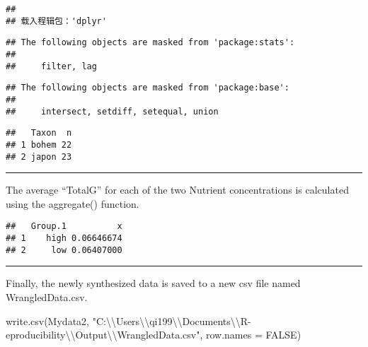 \documentclass[
]{article}
\newenvironment{Shaded}{\begin{snugshade}}{\end{snugshade}}
\newcommand{\AttributeTok}[1]{\textcolor[rgb]{0.77,0.63,0.00}{#1}}
\newcommand{\ConstantTok}[1]{\textcolor[rgb]{0.00,0.00,0.00}{#1}}
\newcommand{\ControlFlowTok}[1]{\textcolor[rgb]{0.13,0.29,0.53}{\textbf{#1}}}
\newcommand{\DecValTok}[1]{\textcolor[rgb]{0.00,0.00,0.81}{#1}}
\newcommand{\FunctionTok}[1]{\textcolor[rgb]{0.00,0.00,0.00}{#1}}
\newcommand{\NormalTok}[1]{#1}
\newcommand{\OtherTok}[1]{\textcolor[rgb]{0.56,0.35,0.01}{#1}}
\newcommand{\SpecialCharTok}[1]{\textcolor[rgb]{0.00,0.00,0.00}{#1}}
\newcommand{\StringTok}[1]{\textcolor[rgb]{0.31,0.60,0.02}{#1}}
\begin{document}
\begin{verbatim}
## 
## 载入程辑包：'dplyr'
\end{verbatim}

\begin{verbatim}
## The following objects are masked from 'package:stats':
## 
##     filter, lag
\end{verbatim}

\begin{verbatim}
## The following objects are masked from 'package:base':
## 
##     intersect, setdiff, setequal, union
\end{verbatim}

\begin{verbatim}
##   Taxon  n
## 1 bohem 22
## 2 japon 23
\end{verbatim}

\begin{center}\rule{0.5\linewidth}{0.5pt}\end{center}

The average ``TotalG'' for each of the two Nutrient concentrations is
calculated using the aggregate() function.

\begin{Shaded}
\end{Shaded}

\begin{verbatim}
##   Group.1          x
## 1    high 0.06646674
## 2     low 0.06407000
\end{verbatim}

\begin{center}\rule{0.5\linewidth}{0.5pt}\end{center}

Finally, the newly synthesized data is saved to a new csv file named
WrangledData.csv.

\begin{Shaded}
\begin{Highlighting}[]
\FunctionTok{write.csv}\NormalTok{(Mydata2, }\StringTok{"C:}\SpecialCharTok{\textbackslash{}\textbackslash{}}\StringTok{Users}\SpecialCharTok{\textbackslash{}\textbackslash{}}\StringTok{qi199}\SpecialCharTok{\textbackslash{}\textbackslash{}}\StringTok{Documents}\SpecialCharTok{\textbackslash{}\textbackslash{}}\StringTok{R{-}eproducibility}\SpecialCharTok{\textbackslash{}\textbackslash{}}\StringTok{Output}\SpecialCharTok{\textbackslash{}\textbackslash{}}\StringTok{WrangledData.csv"}\NormalTok{, }\AttributeTok{row.names =} \ConstantTok{FALSE}\NormalTok{)}
\end{Highlighting}
\end{Shaded}
\end{document}
